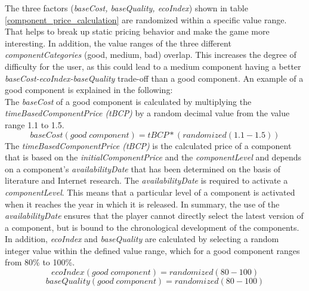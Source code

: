 \newline
The three factors (\textit{baseCost, baseQuality, ecoIndex}) shown in table \ref{component_price_calculation} are randomized within a specific value range. That helps to break up static pricing behavior and make the game more interesting. In addition, the value ranges of the three different \textit{componentCategories} (good, medium, bad) overlap. This increases the degree of difficulty for the user, as this could lead to a medium component having a better \textit{baseCost-ecoIndex-baseQuality} trade-off than a good component. An example of a good component is explained in the following:\\
The \textit{baseCost} of a good component is calculated by multiplying the \textit{timeBasedComponentPrice (tBCP)} by a random decimal value from the value range 1.1 to 1.5.
\begin{equation}
    baseCost(good \; component) = tBCP * (randomized(1.1-1.5))
\end{equation}
The \textit{timeBasedComponentPrice (tBCP)} is the calculated price of a component that is based on the \textit{initialComponentPrice} and the \textit{componentLevel} and depends on a component's \textit{availabilityDate} that has been determined on the basis of literature and Internet research. The \textit{availabilityDate} is required to activate a \textit{componentLevel}. This means that a particular level of a component is activated when it reaches the year in which it is released. In summary, the use of the \textit{availabilityDate} ensures that the player cannot directly select the latest version of a component, but is bound to the chronological development of the components.\\
In addition, \textit{ecoIndex} and \textit{baseQuality} are calculated by selecting a random integer value within the defined value range, which for a good component ranges from 80\% to 100\%.
\begin{equation}
    ecoIndex(good \; component) = randomized(80-100)
\end{equation}
\begin{equation}
    baseQuality(good \; component) = randomized(80-100)
\end{equation}


